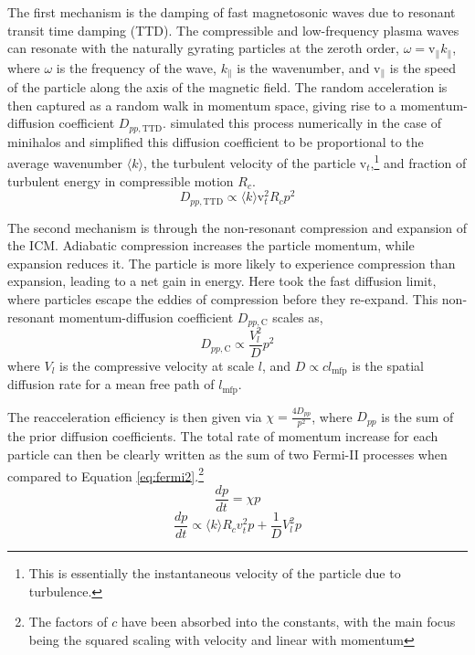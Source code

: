 The first mechanism is the damping of fast magnetosonic waves due to resonant transit time damping (TTD). The compressible and low-frequency plasma waves can resonate with the naturally gyrating particles at the zeroth order, $\omega = \mathrm v_\parallel k_\parallel$, where $\omega$ is the frequency of the wave, $k_\parallel$ is the wavenumber, and $\mathrm v_\parallel$ is the speed of the particle along the axis of the magnetic field. The random acceleration is then captured as a random walk in momentum space, giving rise to a momentum-diffusion coefficient $D_{pp,\mathrm{TTD}}$. \citet{ZuHone2013} simulated this process numerically in the case of minihalos and simplified this diffusion coefficient to be proportional to the average wavenumber $\langle k\rangle$, the turbulent velocity of the particle $\mathrm v_t$,\footnote{This is essentially the instantaneous velocity of the particle due to turbulence.} and fraction of turbulent energy in compressible motion $R_c$.
\begin{equation}
    D_{pp, \mathrm{TTD}} \propto \langle k \rangle \mathrm v_t^2 R_c p^2
\end{equation}

The second mechanism is through the non-resonant compression and expansion of the ICM. Adiabatic compression increases the particle momentum, while expansion reduces it. The particle is more likely to experience compression than expansion, leading to a net gain in energy. Here \citet{ZuHone2013} took the fast diffusion limit, where particles escape the eddies of compression before they re-expand. This non-resonant momentum-diffusion coefficient $D_{pp,\mathrm{C}}$ scales as,
\begin{equation}
    D_{pp,\mathrm{C}} \propto \frac{V_l^2}{D}p^2
\end{equation}
where $V_l$ is the compressive velocity at scale $l$, and $D \propto cl_{\mathrm{mfp}}$ is the spatial diffusion rate for a mean free path of $l_{\mathrm{mfp}}$.

The reacceleration efficiency is then given via $\chi = \frac{4D_{pp}}{p^2}$, where $D_{pp}$ is the sum of the prior diffusion coefficients. The total rate of momentum increase for each particle can then be clearly written  as the sum of two Fermi-II processes when compared to Equation \ref{eq:fermi2}.\footnote{The factors of $c$ have been absorbed into the constants, with the main focus being the squared scaling with velocity and linear with momentum} 
\begin{equation}
    \frac{dp}{dt} = \chi p
\end{equation}
\begin{equation}
    \frac{dp}{dt} \propto \langle k \rangle R_c v_t^2 p + \frac1{D} V_l^2 p
\end{equation}

